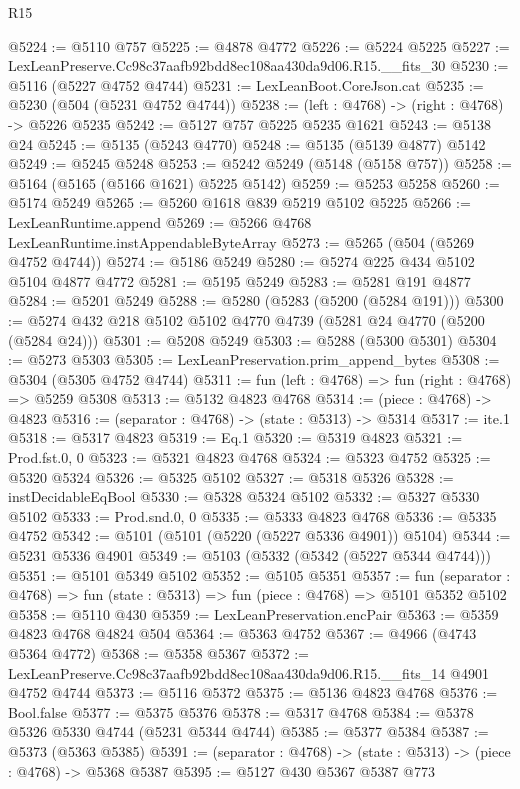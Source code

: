 \begin{lexlean}{R15}
\begin{coremodule}
{{{{{{{{{{{@5224 := @5110 @757
@5225 := @4878 @4772
@5226 := @5224 @5225
@5227 := LexLeanPreserve.Cc98c37aafb92bdd8ec108aa430da9d06.R15.__fits_30
@5230 := @5116 (@5227 @4752 @4744)
@5231 := LexLeanBoot.CoreJson.cat
@5235 := @5230 (@504 (@5231 @4752 @4744))
@5238 := (left : @4768) -> (right : @4768) -> @5226 @5235
@5242 := @5127 @757 @5225 @5235 @1621
@5243 := @5138 @24
@5245 := @5135 (@5243 @4770)
@5248 := @5135 (@5139 @4877) @5142
@5249 := @5245 @5248
@5253 := @5242 @5249 (@5148 (@5158 @757))
@5258 := @5164 (@5165 (@5166 @1621) @5225 @5142)
@5259 := @5253 @5258
@5260 := @5174 @5249
@5265 := @5260 @1618 @839 @5219 @5102 @5225
@5266 := LexLeanRuntime.append
@5269 := @5266 @4768 LexLeanRuntime.instAppendableByteArray
@5273 := @5265 (@504 (@5269 @4752 @4744))
@5274 := @5186 @5249
@5280 := @5274 @225 @434 @5102 @5104 @4877 @4772
@5281 := @5195 @5249
@5283 := @5281 @191 @4877
@5284 := @5201 @5249
@5288 := @5280 (@5283 (@5200 (@5284 @191)))
@5300 := @5274 @432 @218 @5102 @5102 @4770 @4739 (@5281 @24 @4770 (@5200 (@5284 @24)))
@5301 := @5208 @5249
@5303 := @5288 (@5300 @5301)
@5304 := @5273 @5303
@5305 := LexLeanPreservation.prim_append_bytes
@5308 := @5304 (@5305 @4752 @4744)
@5311 := fun (left : @4768) => fun (right : @4768) => @5259 @5308
@5313 := @5132 @4823 @4768
@5314 := (piece : @4768) -> @4823
@5316 := (separator : @4768) -> (state : @5313) -> @5314
@5317 := ite.{1}
@5318 := @5317 @4823
@5319 := Eq.{1}
@5320 := @5319 @4823
@5321 := Prod.fst.{0, 0}
@5323 := @5321 @4823 @4768
@5324 := @5323 @4752
@5325 := @5320 @5324
@5326 := @5325 @5102
@5327 := @5318 @5326
@5328 := instDecidableEqBool
@5330 := @5328 @5324 @5102
@5332 := @5327 @5330 @5102
@5333 := Prod.snd.{0, 0}
@5335 := @5333 @4823 @4768
@5336 := @5335 @4752
@5342 := @5101 (@5101 (@5220 (@5227 @5336 @4901)) @5104)
@5344 := @5231 @5336 @4901
@5349 := @5103 (@5332 (@5342 (@5227 @5344 @4744)))
@5351 := @5101 @5349 @5102
@5352 := @5105 @5351
@5357 := fun (separator : @4768) => fun (state : @5313) => fun (piece : @4768) => @5101 @5352 @5102
@5358 := @5110 @430
@5359 := LexLeanPreservation.encPair
@5363 := @5359 @4823 @4768 @4824 @504
@5364 := @5363 @4752
@5367 := @4966 (@4743 @5364 @4772)
@5368 := @5358 @5367
@5372 := LexLeanPreserve.Cc98c37aafb92bdd8ec108aa430da9d06.R15.__fits_14 @4901 @4752 @4744
@5373 := @5116 @5372
@5375 := @5136 @4823 @4768
@5376 := Bool.false
@5377 := @5375 @5376
@5378 := @5317 @4768
@5384 := @5378 @5326 @5330 @4744 (@5231 @5344 @4744)
@5385 := @5377 @5384
@5387 := @5373 (@5363 @5385)
@5391 := (separator : @4768) -> (state : @5313) -> (piece : @4768) -> @5368 @5387
@5395 := @5127 @430 @5367 @5387 @773
}}}}}}}}}}}
\end{coremodule}
\end{lexlean}
